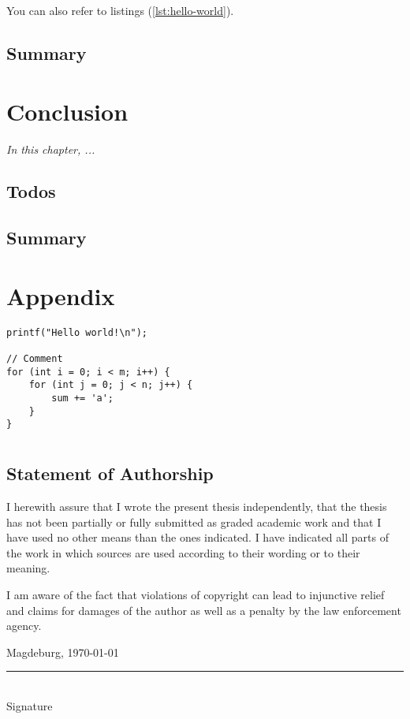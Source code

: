 \documentclass[
	12pt,
	a4paper,
	abstract,
	bibliography=totoc,
	chapterprefix,
	headings=openright,
	numbers=endperiod,
	parskip=half,
	twoside,
]{scrreprt}
\begin{document}
You can also refer to listings (\cref{lst:hello-world}).

\section*{Summary}

\lipsum[2]

\chapter{Conclusion}
\label{cha:conclusion}

\textit{In this chapter, ...}

\section{Todos}


\lipsum[1-2]

\section*{Summary}

\lipsum[2]





\appendix

\chapter{Appendix}
\label{cha:appendix}

\begin{lstlisting}[caption=Caption]
printf("Hello world!\n");

// Comment
for (int i = 0; i < m; i++) {
	for (int j = 0; j < n; j++) {
		sum += 'a';
	}
}
\end{lstlisting}

\chapter*{}

\section*{Statement of Authorship}

I herewith assure that I wrote the present thesis independently, that the thesis has not been partially or fully submitted as graded academic work and that I have used no other means than the ones indicated.
I have indicated all parts of the work in which sources are used according to their wording or to their meaning.

I am aware of the fact that violations of copyright can lead to injunctive relief and claims for damages of the author as well as a penalty by the law enforcement agency.

\bigskip

Magdeburg, \today

\bigskip
\bigskip

\rule{0.5\textwidth}{0.5pt}\\
\hspace*{0.25em}Signature
\end{document}
